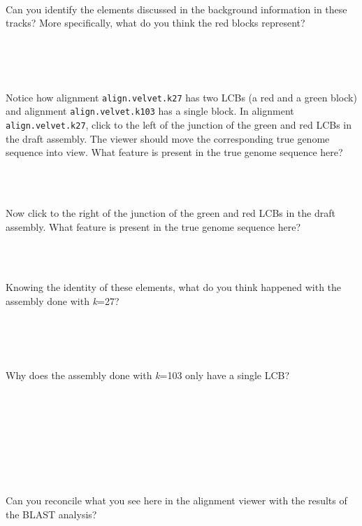 \documentclass[11pt,a4paper]{scrartcl}
\newcommand{\twolines}{
~\\
~\\
~\\
\noindent
}
\newcommand{\oneline}{
~\\
~\\
\noindent
}
\begin{document}
~\\
\noindent
Can you identify the elements discussed in the background information in these
tracks? More specifically, what do you think the red blocks represent?
\twolines

\noindent
Notice how alignment \texttt{align.velvet.k27} has two LCBs (a red and a green block)
and alignment \texttt{align.velvet.k103} has a single block. In alignment
\texttt{align.velvet.k27}, click to the left of the junction of the green and red LCBs
in the draft assembly. The viewer should move the corresponding true genome
sequence into view. What feature is present in the true genome sequence here?
\oneline

\noindent
Now click to the right of the junction of the green and red LCBs in the draft
assembly. What feature is present in the true genome sequence here?
\oneline

\noindent
Knowing the identity of these elements, what do you think happened with the
assembly done with \emph{k}=27? 
\twolines

\noindent
Why does the assembly done with \emph{k}=103 only have a single LCB?
\twolines
\twolines

\noindent
Can you reconcile what you see here in the alignment viewer with the results of the BLAST analysis?
\twolines
\twolines



 
\end{document}
